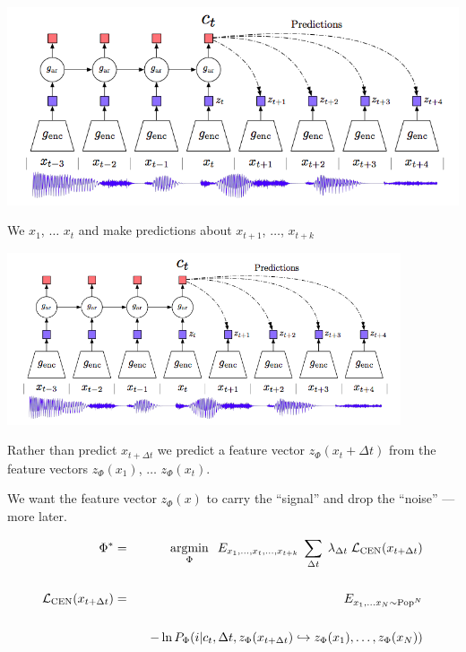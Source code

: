 {

\centerline{\includegraphics[height=3.5 in]{../images/MMI-PC}}

We $x_1$, $\ldots$ $x_t$ and make predictions about $x_{t+1}$, $\ldots$, $x_{t+k}$


\centerline{\includegraphics[height = 2.0in]{../images/MMI-PC}}

Rather than predict $x_{t+ \Delta t}$ we predict a feature vector $z_\Phi(x_t + \Delta t)$ from the feature vectors $z_\Phi(x_1)$, $\ldots$ $z_\Phi(x_t)$.

\vfill
We want the feature vector $z_\Phi(x)$ to carry the ``signal'' and drop the ``noise'' --- more later.


\begin{eqnarray*}
\Phi^* & = & \operatorname*{argmin}_\Phi\;\;E_{x_1,\ldots,x_t,\ldots,x_{t+k}} \;\sum_{\Delta t} \;\lambda_{\Delta t}\; {\cal L}_\mathrm{CEN}(x_{t+\Delta t}) \\
\\
{\cal L}_{\mathrm{CEN}}(x_{t+\Delta t}) & = & E_{x_1,\ldots x_N \sim \mathrm{Pop}^N}\\
\\
& & \;\;\;-\ln P_\Phi(i|c_t,\Delta t,z_\Phi(x_{t+\Delta t}) \hookrightarrow z_\Phi(x_1),\ldots,z_\Phi(x_N))
\end{eqnarray*}

}
